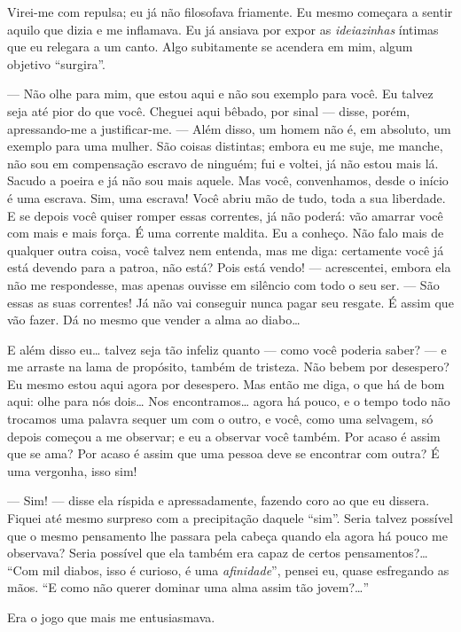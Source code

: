 Virei-me com repulsa; eu já não filosofava friamente. Eu mesmo começara
a sentir aquilo que dizia e me inflamava. Eu já ansiava por expor as
\textit{ideiazinhas} íntimas que eu relegara a um canto. Algo
subitamente se acendera em mim, algum objetivo “surgira”.

--- Não olhe para mim, que estou aqui e não sou exemplo para você. Eu
talvez seja até pior do que você. Cheguei aqui bêbado, por sinal ---
disse, porém, apressando-me a justificar-me. --- Além disso, um homem
não é, em absoluto, um exemplo para uma mulher. São coisas distintas;
embora eu me suje, me manche, não sou em compensação escravo de
ninguém; fui e voltei, já não estou mais lá. Sacudo a poeira e já não
sou mais aquele. Mas você, convenhamos, desde o início é uma escrava.
Sim, uma escrava! Você abriu mão de tudo, toda a sua liberdade. E se
depois você quiser romper essas correntes, já não poderá: vão amarrar
você com mais e mais força. É uma corrente maldita. Eu a conheço. Não
falo mais de qualquer outra coisa, você talvez nem entenda, mas me
diga: certamente você já está devendo para a patroa, não está? Pois
está vendo! --- acrescentei, embora ela não me respondesse, mas apenas
ouvisse em silêncio com todo o seu ser. --- São essas as suas correntes!
Já não vai conseguir nunca pagar seu resgate. É assim que vão fazer. Dá
no mesmo que vender a alma ao diabo\ldots{}

E além disso eu\ldots{} talvez seja tão infeliz quanto --- como você poderia
saber? --- e me arraste na lama de propósito, também de tristeza. Não
bebem por desespero? Eu mesmo estou aqui agora por desespero. Mas então
me diga, o que há de bom aqui: olhe para nós dois\ldots{} Nos encontramos\ldots{}
agora há pouco, e o tempo todo não trocamos uma palavra sequer um com o
outro, e você, como uma selvagem, só depois começou a me observar; e eu
a observar você também. Por acaso é assim que se ama? Por acaso é assim
que uma pessoa deve se encontrar com outra? É uma vergonha, isso sim!

--- Sim! --- disse ela ríspida e apressadamente, fazendo coro ao que eu
dissera. Fiquei até mesmo surpreso com a precipitação daquele “sim”.
Seria talvez possível que o mesmo pensamento lhe passara pela cabeça
quando ela agora há pouco me observava? Seria possível que ela também
era capaz de certos pensamentos?\ldots{} “Com mil diabos, isso é curioso, é
uma \textit{afinidade}”, pensei eu, quase esfregando as mãos. “E como
não querer dominar uma alma assim tão jovem?\ldots{}”

Era o jogo que mais me entusiasmava.

